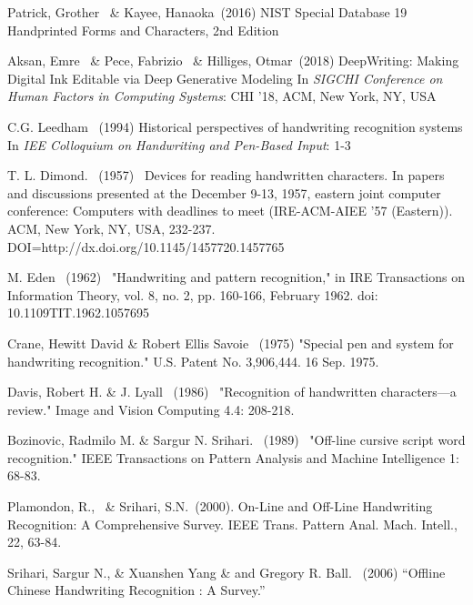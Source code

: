 \documentclass{article}
\begin{document}
\begin{thebibliography}{99}
   Patrick, Grother \ \&  Kayee, Hanaoka\ (2016) NIST Special Database 19 Handprinted Forms and Characters, 2nd Edition

   Aksan, Emre \ \& Pece, Fabrizio \ \& Hilliges, Otmar\ (2018) DeepWriting: Making Digital Ink Editable via Deep Generative Modeling
  In {\itshape SIGCHI Conference on Human Factors in Computing Systems}: CHI '18, ACM, New York, NY, USA

   C.G. Leedham \ (1994) Historical perspectives of handwriting recognition systems
  In {\itshape IEE Colloquium on Handwriting and Pen-Based Input}: 1-3

   T. L. Dimond. \ (1957) \ Devices for reading handwritten characters.  In papers and discussions presented at the December 9-13, 1957, eastern joint computer conference: Computers with deadlines to meet (IRE-ACM-AIEE '57 (Eastern)). ACM, New York, NY, USA,  232-237. DOI=http://dx.doi.org/10.1145/1457720.1457765

   M. Eden \ (1962) \ "Handwriting and pattern recognition," in IRE Transactions on Information Theory, vol. 8, no. 2, pp. 160-166, February 1962. doi: 10.1109\/TIT.1962.1057695
  
   Crane, Hewitt David \& Robert Ellis Savoie \ (1975) "Special pen and system for handwriting recognition." U.S. Patent No. 3,906,444. 16 Sep. 1975.

   Davis, Robert H. \& J. Lyall \ (1986) \ "Recognition of handwritten characters—a review." Image and Vision Computing 4.4: 208-218.

   Bozinovic, Radmilo M. \& Sargur N. Srihari. \ (1989) \ "Off-line cursive script word recognition." IEEE Transactions on Pattern Analysis and Machine Intelligence 1: 68-83.

   Plamondon, R., \ \& Srihari, S.N.\ (2000).
  On-Line and Off-Line Handwriting Recognition: A Comprehensive Survey. IEEE Trans. Pattern Anal. Mach. Intell., 22, 63-84.

   Srihari, Sargur N., \& Xuanshen Yang \& and Gregory R. Ball. \ (2006) “Offline Chinese Handwriting Recognition : A Survey.”


\end{thebibliography}
\end{document}
